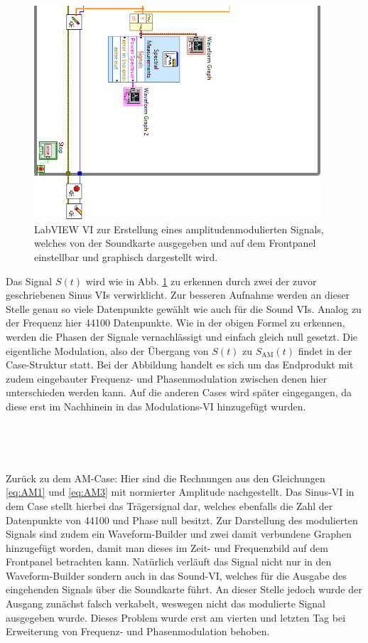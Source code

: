 \begin{figure}[H]
	\centering
	\includegraphics[width=0.95\textwidth]{pic/am2.png}
	\caption{LabVIEW VI zur Erstellung eines amplitudenmodulierten Signals, welches von der Soundkarte ausgegeben und auf dem Frontpanel einstellbar und graphisch dargestellt wird.}
	\label{fig:am}	
\end{figure} 

\thispagestyle{empty}
Das Signal $S(t)$ wird wie in Abb. \ref{fig:am} zu erkennen durch zwei der zuvor geschriebenen Sinus VIs verwirklicht.
Zur besseren Aufnahme werden an dieser Stelle genau so viele Datenpunkte gewählt wie auch für die Sound VIs. 
Analog zu der Frequenz hier 44100 Datenpunkte.
Wie in der obigen Formel zu erkennen, werden die Phasen der Signale vernachlässigt und einfach gleich null gesetzt.
Die eigentliche Modulation, also der Übergang von $S(t)$ zu $S_\text{AM}(t)$ findet in der Case-Struktur statt.
Bei der Abbildung handelt es sich um das Endprodukt mit zudem eingebauter Frequenz- und Phasenmodulation zwischen denen hier unterschieden werden kann.
Auf die anderen Cases wird später eingegangen, da diese erst im Nachhinein in das Modulations-VI hinzugefügt wurden.
	
\

\

Zurück zu dem AM-Case: Hier sind die Rechnungen aus den Gleichungen \ref{eq:AM1} und \ref{eq:AM3} mit normierter Amplitude nachgestellt.
Das Sinus-VI in dem Case stellt hierbei das Trägersignal dar, welches ebenfalls die Zahl der Datenpunkte von 44100 und Phase null besitzt.
Zur Darstellung des modulierten Signals sind zudem ein Waveform-Builder und zwei damit verbundene Graphen hinzugefügt worden, damit man dieses im Zeit- und Frequenzbild auf dem Frontpanel betrachten kann.
Natürlich verläuft das Signal nicht nur in den Waveform-Builder sondern auch in das Sound-VI, welches für die Ausgabe des eingehenden Signals über die Soundkarte führt.
An dieser Stelle jedoch wurde der Ausgang zunächst falsch verkabelt, weswegen nicht das modulierte Signal ausgegeben wurde.
Dieses Problem wurde erst am vierten und letzten Tag bei Erweiterung von Frequenz- und Phasenmodulation behoben.
	
